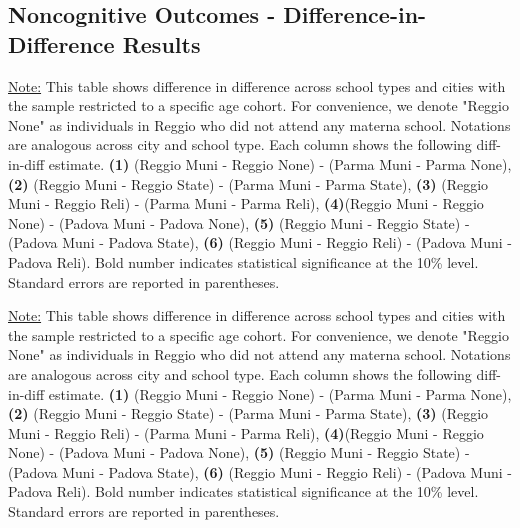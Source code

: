 \documentclass[11pt]{article}
\newcommand{\fnDID}{\underline{Note:} This table shows difference in difference across school types and cities with the sample restricted to a specific age cohort. For convenience, we denote "Reggio None" as individuals in Reggio who did not attend any materna school. Notations are analogous across city and school type. Each column shows the following diff-in-diff estimate. \textbf{(1)} (Reggio Muni - Reggio None) - (Parma Muni - Parma None), \textbf{(2)} (Reggio Muni - Reggio State) - (Parma Muni -  Parma State), \textbf{(3)} (Reggio Muni - Reggio Reli) - (Parma Muni - Parma Reli), \textbf{(4)}(Reggio Muni - Reggio None) - (Padova Muni - Padova None),  \textbf{(5)}  (Reggio Muni - Reggio State) - (Padova Muni - Padova State), \textbf{(6)}  (Reggio Muni - Reggio Reli) - (Padova Muni - Padova Reli). Bold number indicates statistical significance at the 10\% level. Standard errors are reported in parentheses.}
\begin{document}

\subsection{Noncognitive Outcomes - Difference-in-Difference Results}

\begin{table}[H]
\begin{center}
	\caption{Difference-in-Difference Across School Types and Cities, Restricting to Age-30 Cohort} \label{table:NCh-30}
	\scalebox{0.80}{
		}
\end{center}
\footnotesize
\fnDID
\end{table}

\begin{table}[H]
\begin{center}
	\caption{Difference-in-Difference Across School Types and Cities, Restricting to Age-40 Cohort} \label{table:NCh-40}
	\scalebox{0.80}{
		}
\end{center}
\footnotesize
\fnDID
\end{table}

%
\end{document}
